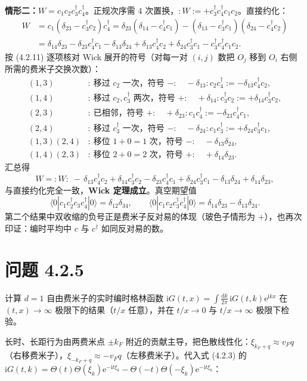 \textbf{情形二：}$W=c_1c_2c^\dagger_3c^\dagger_4$。正规次序需 4 次置换，$:W:=+c^\dagger_3c^\dagger_4c_1c_2$。直接约化：
\begin{align*}
W&=c_1(\delta_{23}-c^\dagger_3c_2)c^\dagger_4
=\delta_{23}(\delta_{14}-c^\dagger_4c_1)-(\delta_{13}-c^\dagger_3c_1)(\delta_{24}-c^\dagger_4c_2)\\
&=\delta_{14}\delta_{23}-\delta_{23}c^\dagger_4c_1-\delta_{13}\delta_{24}+\delta_{13}c^\dagger_4c_2+\delta_{24}c^\dagger_3c_1-c^\dagger_3c^\dagger_4c_1c_2 .
\end{align*}
按 (4.2.11) 逐项核对 Wick 展开的符号（对每一对 $(i,j)$ 数把 $O_j$ 移到 $O_i$ 右侧所需的费米子交换次数）：
\begin{align*}
(1,3)&:\ \text{移过 }c_2\text{ 一次，符号 }-:\quad-\delta_{13}:c_2c^\dagger_4:=-\delta_{13}c^\dagger_4c_2,\\
(1,4)&:\ \text{移过 }c_2,c^\dagger_3\text{ 两次，符号 }+:\quad+\delta_{14}:c^\dagger_3c_2:=+\delta_{14}c^\dagger_3c_2,\\
(2,3)&:\ \text{已相邻，符号 }+:\quad+\delta_{23}:c_1c^\dagger_4:=-\delta_{23}c^\dagger_4c_1,\\
(2,4)&:\ \text{移过 }c^\dagger_3\text{ 一次，符号 }-:\quad-\delta_{24}:c_1c^\dagger_3:=+\delta_{24}c^\dagger_3c_1,\\
(1,3)(2,4)&:\ \text{移位 }1+0=1\text{ 次，符号 }-:\quad-\delta_{13}\delta_{24},\\
(1,4)(2,3)&:\ \text{移位 }2+0=2\text{ 次，符号 }+:\quad+\delta_{14}\delta_{23}.
\end{align*}
汇总得
\begin{equation*}
W=:\!W\!:\;-\,\delta_{13}c^\dagger_4c_2+\delta_{14}c^\dagger_3c_2-\delta_{23}c^\dagger_4c_1+\delta_{24}c^\dagger_3c_1
-\delta_{13}\delta_{24}+\delta_{14}\delta_{23},
\end{equation*}
与直接约化完全一致，\textbf{Wick 定理成立}。真空期望值
\begin{equation*}
\langle0|c_1c^\dagger_2c_3c^\dagger_4|0\rangle=\delta_{12}\delta_{34},\qquad
\langle0|c_1c_2c^\dagger_3c^\dagger_4|0\rangle=\delta_{14}\delta_{23}-\delta_{13}\delta_{24}.
\end{equation*}
第二个结果中双收缩的负号正是费米子反对易的体现（玻色子情形为 $+$），也再次印证：编时平均中 $c$ 与 $c^\dagger$ 如同反对易的数。

\section*{问题 4.2.5}
\begin{problem}
计算 $d=1$ 自由费米子的实时编时格林函数 $\mathrm{i}G(t,x)=\int\frac{\mathrm{d}k}{2\pi}\,\mathrm{i}G(t,k)\mathrm{e}^{\mathrm{i}kx}$ 在 $(t,x)\to\infty$ 极限下的结果（$t/x$ 任意），并在 $t/x\to0$ 与 $t/x\to\infty$ 极限下检验。
\end{problem}
\solution
长时、长距行为由两费米点 $\pm k_F$ 附近的贡献主导，把色散线性化：$\xi_{k_F+q}\approx v_Fq$（右移费米子），$\xi_{-k_F+q}\approx -v_Fq$（左移费米子）。代入式 (4.2.3) 的 $\mathrm{i}G(t,k)=\Theta(t)\Theta(\xi_k)\mathrm{e}^{-\mathrm{i}t\xi_k}-\Theta(-t)\Theta(-\xi_k)\mathrm{e}^{-\mathrm{i}t\xi_k}$：

